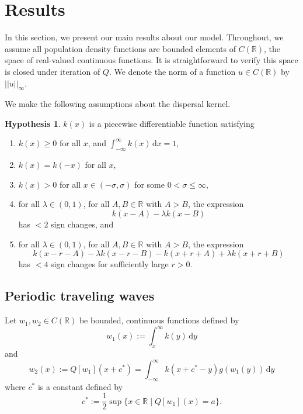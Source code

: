 \documentclass[11pt]{article}
\theoremstyle{definition}
\newtheorem{hyp}[thm]{Hypothesis}
\numberwithin{equation}{section}
\numberwithin{thm}{section}
\newcommand{\wone}{w_1}
\newcommand{\wtwo}{w_2}
\renewcommand{\a}{a}
\renewcommand{\d}{\,\mathrm{d}}
\begin{document}
\section{Results}

In this section, we present our main results about our model.
Throughout, we assume all population density functions are bounded elements of $C(\mathbb R)$, the space of real-valued continuous functions.
It is straightforward to verify this space is closed under iteration of $Q$.
We denote the norm of a function $u \in C(\mathbb R)$ by $||u||_\infty$.

We make the following assumptions about the dispersal kernel.
\begin{hyp}
$k(x)$ is a piecewise differentiable function satisfying
\begin{enumerate}[(H1)]
\item $k(x) \geq 0$ for all $x$, and $\int_{-\infty}^{\infty} k(x) \d x = 1$, \label{h1}

\item $k(x)=k(-x)$ for all $x$,\label{h2}

\item $k(x)>0$ for all $x \in (-\sigma,\sigma)$ for some $0 < \sigma \leq \infty$,\label{h3}

\item \label{h4}
for all $\lambda \in (0,1)$, for all $A,B\in\mathbb R$ with $A>B$, the expression
$$
k(x-A) - \lambda k(x-B)
$$
has $<2$ sign changes, and

\item \label{h5}
for all $\lambda \in (0,1)$, for all $A,B\in\mathbb R$ with $A>B$, the expression
$$
k(x-r-A) - \lambda k(x-r-B) - k(x+r+A) + \lambda k(x+r+B)
$$
has $<4$ sign changes for sufficiently large $r>0$.
\end{enumerate}
\end{hyp}

\subsection{Periodic traveling waves}

Let $\wone,\wtwo \in C(\mathbb R)$ be bounded, continuous functions defined by
\begin{equation} \label{w1}
\wone(x) :=\int_x^\infty k(y) \d y
\end{equation}
and
\begin{equation} \label{w2}
\wtwo(x) := Q[\wone](x+c^*) = \int_{-\infty}^{\infty} k(x+c^*-y) g(\wone(y)) \d y
\end{equation}
where $c^*$ is a constant defined by
\begin{equation} \label{c}
c^* := \frac{1}{2} \sup \{ x\in\mathbb R \mid Q[\wone](x) = \a \}.
\end{equation}
\end{document}
